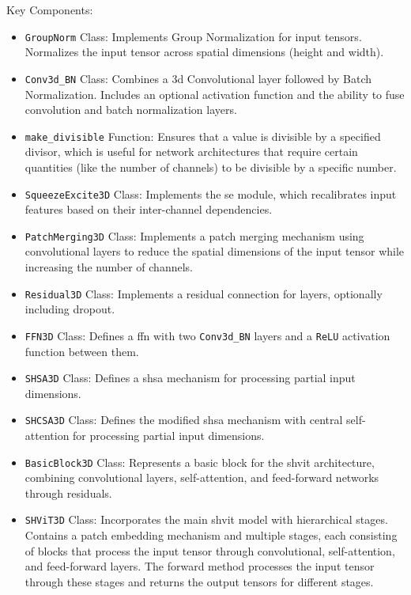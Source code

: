 \noindent Key Components:
\begin{itemize}
	\item {\tt GroupNorm} Class: Implements Group Normalization for input tensors. Normalizes the input tensor across spatial dimensions (height and width).
	
	\item {\tt Conv3d\_BN} Class: Combines a \gls{3d} Convolutional layer followed by Batch Normalization. Includes an optional activation function and the ability to fuse convolution and batch normalization layers.
	
	\item {\tt make\_divisible} Function: Ensures that a value is divisible by a specified divisor, which is useful for network architectures that require certain quantities (like the number of channels) to be divisible by a specific number.
	
	\item {\tt SqueezeExcite3D} Class: Implements the \gls{se} module, which recalibrates input features based on their inter-channel dependencies.
	
	\item {\tt PatchMerging3D} Class: Implements a patch merging mechanism using convolutional layers to reduce the spatial dimensions of the input tensor while increasing the number of channels.
	
	\item {\tt Residual3D} Class: Implements a residual connection for layers, optionally including dropout.
	
	\item {\tt FFN3D} Class: Defines a \gls{ffn} with two {\tt Conv3d\_BN} layers and a {\tt ReLU} activation function between them.
	
	\item {\tt SHSA3D} Class: Defines a \gls{shsa} mechanism for processing partial input dimensions.

	\item {\tt SHCSA3D} Class: Defines the modified \gls{shsa} mechanism with central self-attention for processing partial input dimensions.
	
	\item {\tt BasicBlock3D} Class: Represents a basic block for the \gls{shvit} architecture, combining convolutional layers, self-attention, and feed-forward networks through residuals.
	
	\item {\tt SHViT3D} Class: Incorporates the main \gls{shvit} model with hierarchical stages.
	Contains a patch embedding mechanism and multiple stages, each consisting of blocks that process the input tensor through convolutional, self-attention, and feed-forward layers.
	The forward method processes the input tensor through these stages and returns the output tensors for different stages.
\end{itemize}

